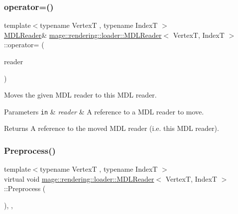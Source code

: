 \subsubsection{\texorpdfstring{operator=()}{operator=()}\hspace{0.1cm}{\footnotesize\ttfamily [2/2]}}
{\footnotesize\ttfamily template$<$typename VertexT , typename IndexT $>$ \\
\hyperlink{classmage_1_1rendering_1_1loader_1_1_m_d_l_reader}{M\+D\+L\+Reader}\& \hyperlink{classmage_1_1rendering_1_1loader_1_1_m_d_l_reader}{mage\+::rendering\+::loader\+::\+M\+D\+L\+Reader}$<$ VertexT, IndexT $>$\+::operator= (\begin{DoxyParamCaption}\item[{\hyperlink{classmage_1_1rendering_1_1loader_1_1_m_d_l_reader}{M\+D\+L\+Reader}$<$ VertexT, IndexT $>$ \&\&}]{reader }\end{DoxyParamCaption})\hspace{0.3cm}{\ttfamily [delete]}}

Moves the given M\+DL reader to this M\+DL reader.


\begin{DoxyParams}[1]{Parameters}
\mbox{\tt in}  & {\em reader} & A reference to a M\+DL reader to move. \\
\hline
\end{DoxyParams}
\begin{DoxyReturn}{Returns}
A reference to the moved M\+DL reader (i.\+e. this M\+DL reader). 
\end{DoxyReturn}
\hypertarget{classmage_1_1rendering_1_1loader_1_1_m_d_l_reader_a397f0c0eedc56c983fc3a7074aa4e577}{}\label{classmage_1_1rendering_1_1loader_1_1_m_d_l_reader_a397f0c0eedc56c983fc3a7074aa4e577} 
\subsubsection{\texorpdfstring{Preprocess()}{Preprocess()}}
{\footnotesize\ttfamily template$<$typename VertexT , typename IndexT $>$ \\
virtual void \hyperlink{classmage_1_1rendering_1_1loader_1_1_m_d_l_reader}{mage\+::rendering\+::loader\+::\+M\+D\+L\+Reader}$<$ VertexT, IndexT $>$\+::Preprocess (\begin{DoxyParamCaption}{ }\end{DoxyParamCaption})\hspace{0.3cm}{\ttfamily [override]}, {\ttfamily [private]}, {\ttfamily [virtual]}}

